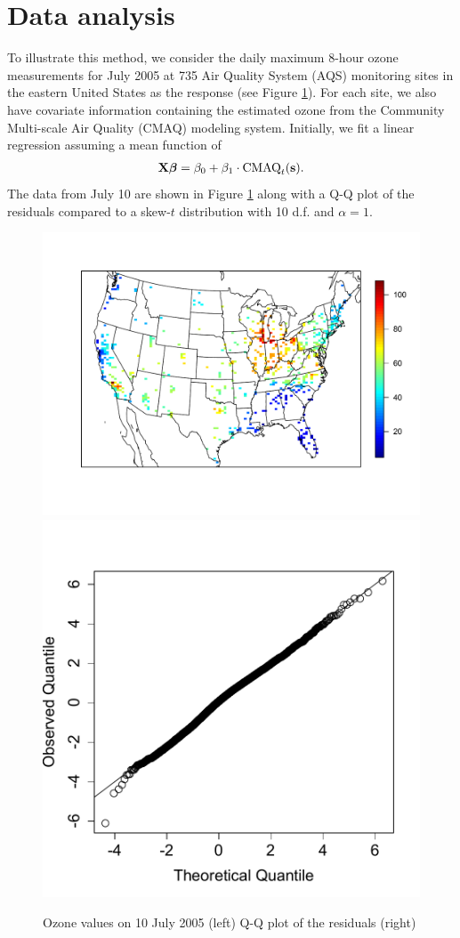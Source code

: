 \documentclass[11pt]{article}
\begin{document}
\section{Data analysis}\label{s:analysis}
To illustrate this method, we consider the daily maximum 8-hour ozone measurements for July 2005 at 735 Air Quality System (AQS) monitoring sites in the eastern United States as the response (see Figure \ref{fig:ozone}).
For each site, we also have covariate information containing the estimated ozone from the Community Multi-scale Air Quality (CMAQ) modeling system.
Initially, we fit a linear regression assuming a mean function of
\begin{align}
  \mbox{\bf X} \mbox{\boldmath $\beta$} = \beta_0 + \beta_1 \cdot \text{CMAQ}_t(\mbox{\bf s}). \label{eq:datamean}
\end{align}
The data from July 10 are shown in Figure \ref{fig:ozone} along with a Q-Q plot of the residuals compared to a skew-$t$ distribution with 10 d.f. and $\alpha = 1$.
\begin{figure}
  \centering
  \includegraphics[width=0.56\linewidth]{plots/ozone-10jul-us.pdf}
  \includegraphics[width=0.41\linewidth]{plots/qq-res.pdf}
  \caption{Ozone values on 10 July 2005 (left) Q-Q plot of the residuals (right)}
  \label{fig:ozone}
\end{figure}
\end{document}
